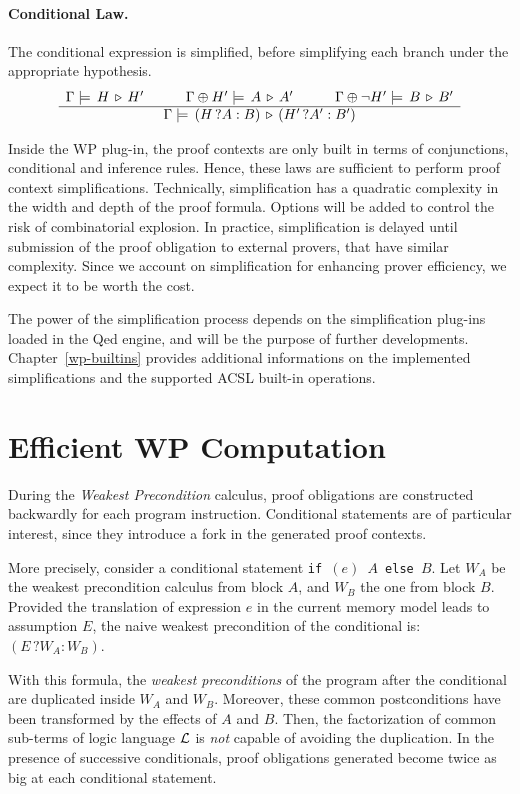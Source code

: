\paragraph{Conditional Law.}
The conditional expression is simplified, before simplifying each
branch under the appropriate hypothesis.
\[\begin{array}{c}{\Gamma\models\,H\,\triangleright\,H'\quad\quad\quad\Gamma\oplus H'\models\,A\,\triangleright\,A'\quad\quad\quad\Gamma\oplus \neg H'\models\,B\,\triangleright\,B'}\\\hline{\Gamma\models\,(H\,?A:B)\,\triangleright\,(H'\,?A':B')}\end{array}
\]

Inside the \textsf{WP} plug-in, the proof contexts are only built in
terms of conjunctions, conditional and inference rules. Hence, these
laws are sufficient to perform proof context simplifications.
Technically, simplification has a quadratic complexity in the width
and depth of the proof formula. Options will be added to control the
risk of combinatorial explosion. In practice, simplification is
delayed until submission of the proof obligation to external provers,
that have similar complexity. Since we account on simplification for
enhancing prover efficiency, we expect it to be worth the cost.

The power of the simplification process depends on the simplification plug-ins
loaded in the \textsf{Qed} engine, and will be the purpose of further
developments. Chapter~\ref{wp-builtins} provides additional informations on the
implemented simplifications and the supported \textsf{ACSL} built-in operations.

\section{Efficient WP Computation}

During the \emph{Weakest Precondition} calculus, proof obligations are
constructed backwardly for each program instruction. Conditional
statements are of particular interest, since they introduce a fork in
the generated proof contexts.

More precisely, consider a conditional statement \texttt{if $(e)$ $A$
  else $B$}. Let $W_A$ be the weakest precondition calculus from block
$A$, and $W_B$ the one from block $B$. Provided the translation of expression
$e$ in the current memory model leads to assumption $E$, the naive
weakest precondition of the conditional is: $(E \, ? W_A : W_B)$.

With this formula, the \emph{weakest preconditions} of the program
after the conditional are duplicated inside $W_A$ and $W_B$. Moreover, these
common postconditions have been transformed by the effects of $A$ and
$B$.  Then, the factorization of common sub-terms of logic language
$\cal{L}$ is \emph{not} capable of avoiding the duplication. In the presence of
successive conditionals, proof obligations generated become twice as
big at each conditional statement.

